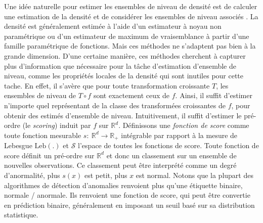 \documentclass[a4paper, 12pt]{article}
\def\rset{\mathbb{R}}
\def\S{\mathcal{S}}
\def\leb{\text{Leb}}
\begin{document}

Une idée naturelle pour estimer les ensembles de niveau de densité est de calculer une estimation de la densité et de considérer les ensembles de niveau associés \citep{Tsybakov1997, Cuevas1997, Baillo2001, Baillo2003, Cadre2006, Rigollet2009, Mason2009}.
La densité est généralement estimée à l'aide d'un estimateur à noyau non paramétrique ou d'un estimateur de maximum de vraisemblance à partir d'une famille paramétrique de fonctions. Mais ces méthodes ne s'adaptent pas bien à la  grande dimension. D'une certaine manière, ces méthodes cherchent à capturer plus d'information que nécessaire pour la tâche d'estimation d'ensemble de niveau, comme les propriétés locales de la densité qui sont inutiles pour cette tache. En effet, il s'avère que pour toute transformation croissante $ T $, les ensembles de niveau de $ T \circ f $ sont exactement ceux de $ f $. Ainsi, il suffit d'estimer n'importe quel représentant de la classe des transformées croissantes de $ f $, pour obtenir des estimés d'ensemble de niveau. Intuitivement, il suffit d'estimer le pré-ordre (le \emph {scoring}) induit par $ f $ sur $ \rset ^ d $. Définissons une \emph {fonction de score} comme toute fonction mesurable $ s:~ \rset ^ d \to \rset _ + $ intégrable par rapport à la mesure de Lebesgue $ \leb (.) $ et $ \S $ l'espace de toutes les fonctions de score.
Toute fonction de score définit un pré-ordre sur $ \rset ^ d $ et donc un classement sur un ensemble de nouvelles observations. Ce classement peut être interprété comme un degré d'anormalité, plus $ s (x) $ est petit, plus $ x $ est normal. Notons que la plupart des algorithmes de détection d'anomalies renvoient plus qu'une étiquette binaire, normale / anormale. Ils renvoient une fonction de score, qui peut être convertie en prédiction binaire, généralement en imposant un seuil basé sur sa distribution statistique.
\end{document}
